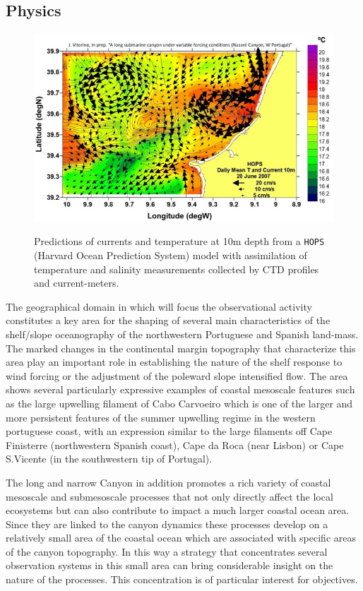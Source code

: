 \subsection{Physics}

\begin{figure}[!b]
  \centering
  \includegraphics[scale=0.50]{fig/model.jpeg}
  \label{fig:model}
  \caption{Predictions of currents and temperature at 10m depth from
  a \texttt{HOPS} (Harvard Ocean Prediction System) model with
  assimilation of temperature and salinity measurements collected by
  CTD profiles and current-meters.}
\end{figure}

The geographical domain in which \proj will focus the observational
activity constitutes a key area for the shaping of several main
characteristics of the shelf/slope oceanography of the northwestern
Portuguese and Spanish land-mass. The marked changes in the
continental margin topography that characterize this area play an
important role in establishing the nature of the shelf response to
wind forcing or the adjustment of the poleward slope intensified
flow. The area shows several particularly expressive examples of
coastal mesoscale features such as the large upwelling filament of
Cabo Carvoeiro which is one of the larger and more persistent features
of the summer upwelling regime in the western portuguese coast, with
an expression similar to the large filaments off Cape Finisterre
(northwestern Spanish coast), Cape da Roca (near Lisbon) or Cape
S.Vicente (in the southwestern tip of Portugal).

The long and narrow \naz Canyon in addition promotes a rich variety of
coastal mesoscale and submesoscale processes that not only directly
affect the local ecosystems but can also contribute to impact a much
larger coastal ocean area. Since they are linked to the canyon
dynamics these processes develop on a relatively small area of the
coastal ocean which are associated with specific areas of the canyon
topography. In this way a strategy that concentrates several
observation systems in this small area can bring considerable insight
on the nature of the processes. This concentration is of particular
interest for \proj objectives. 
 
 